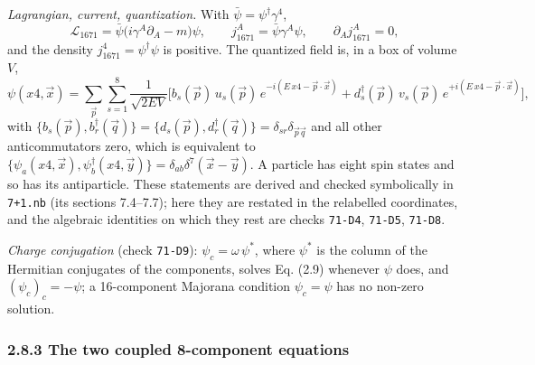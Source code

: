 \documentclass[
  10pt,
]{article}
\begin{document}
\emph{Lagrangian, current, quantization.} With
\(\bar\psi=\psi^\dagger\gamma^4\),
\[\mathcal{L}_{1671}=\bar\psi\big(i\gamma^A\partial_A-m\big)\psi,\qquad j_{1671}^A=\bar\psi\gamma^A\psi,\qquad\partial_Aj^A_{1671}=0,\]
and the density \(j_{1671}^4=\psi^\dagger\psi\) is positive. The
quantized field is, in a box of volume \(V\),
\[\psi(x4,\vec x)=\sum_{\vec p}\sum_{s=1}^{8}\frac{1}{\sqrt{2EV}}\Big[b_s(\vec p)\,u_s(\vec p)\,e^{-i(E\,x4-\vec p\cdot\vec x)}+d_s^\dagger(\vec p)\,v_s(\vec p)\,e^{+i(E\,x4-\vec p\cdot\vec x)}\Big],\]
with
\(\{b_s(\vec p),b_r^\dagger(\vec q)\}=\{d_s(\vec p),d_r^\dagger(\vec q)\}=\delta_{sr}\delta_{\vec p\vec q}\)
and all other anticommutators zero, which is equivalent to
\(\{\psi_a(x4,\vec x),\psi_b^\dagger(x4,\vec y)\}=\delta_{ab}\delta^7(\vec x-\vec y)\).
A particle has eight spin states and so has its antiparticle. These
statements are derived and checked symbolically in \texttt{7+1.nb} (its
sections 7.4--7.7); here they are restated in the relabelled
coordinates, and the algebraic identities on which they rest are checks
\texttt{71-D4}, \texttt{71-D5}, \texttt{71-D8}.

\emph{Charge conjugation} (check \texttt{71-D9}):
\(\psi_c=\omega\,\psi^*\), where \(\psi^*\) is the column of the
Hermitian conjugates of the components, solves Eq. (2.9) whenever
\(\psi\) does, and \((\psi_c)_c=-\psi\); a 16-component Majorana
condition \(\psi_c=\psi\) has no non-zero solution.

\hypertarget{the-two-coupled-8-component-equations-1}{%
\subsubsection{2.8.3 The two coupled 8-component
equations}\label{the-two-coupled-8-component-equations-1}}
\end{document}

